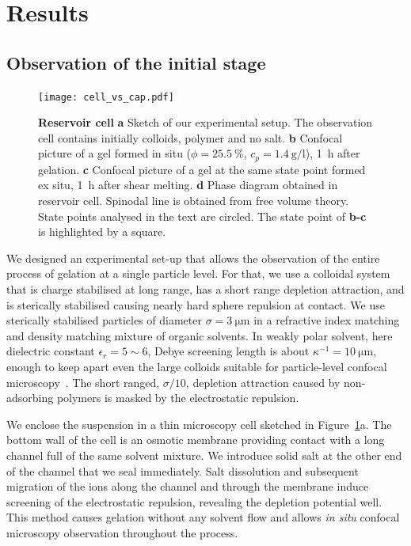 \section*{Results}

\subsection*{Observation of the initial stage}

\begin{figure}
	\texttt{[image: cell\_vs\_cap.pdf]}
	\caption{\textbf{Reservoir cell} \textbf{a} Sketch of our experimental setup. The observation cell contains initially colloids, polymer and no salt. \textbf{b} Confocal picture of a gel formed in situ ($\phi=25.5~\%$, $c_p=\SI{1.4}{\gram\per\litre}$), \SI{1}{\hour} after gelation. \textbf{c} Confocal picture of a gel at the same state point formed ex situ, \SI{1}{\hour} after shear melting. \textbf{d} Phase diagram obtained in reservoir cell. Spinodal line is obtained from free volume theory. State points analysed in the text are circled. The state point of \textbf{b-c} is highlighted by a square.}
	\label{fig:cell_vs_cap}
\end{figure}

We designed an experimental set-up that allows the observation of the entire process of gelation at a single particle level. For that, we use a colloidal system that is charge stabilised at long range, has a short range depletion attraction, and is sterically stabilised causing nearly hard sphere repulsion at contact. We use sterically stabilised particles of diameter $\sigma=\SI{3}{\micro\metre}$ in a refractive index matching and density matching mixture of organic solvents. In weakly polar solvent, here dielectric constant $\epsilon_r = 5\sim6$, Debye screening length is about $\kappa^{-1}=\SI{10}{\micro\metre}$, enough to keep apart even the large colloids suitable for particle-level confocal microscopy~\cite{Royall2003}. The short ranged, $\sigma/10$, depletion attraction caused by non-adsorbing polymers is masked by the electrostatic repulsion.

We enclose the suspension in a thin microscopy cell sketched in Figure~\ref{fig:cell_vs_cap}a. The bottom wall of the cell is an osmotic membrane providing contact with a long channel full of the same solvent mixture. We introduce solid salt at the other end of the channel that we seal immediately. Salt dissolution and subsequent migration of the ions along the channel and through the membrane induce screening of the electrostatic repulsion, revealing the depletion potential well. This method causes gelation without any solvent flow and allows \textit{in situ} confocal microscopy observation throughout the process.

